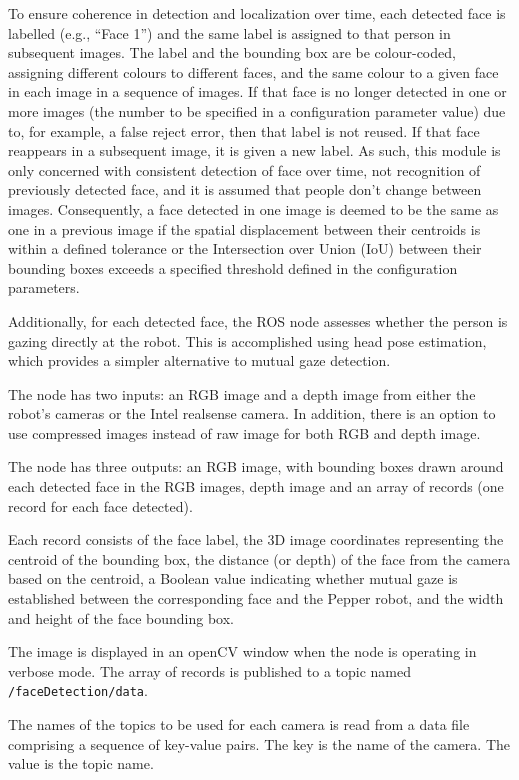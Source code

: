 \documentclass{CSSRforAfrica}
\begin{document}
To ensure coherence in detection and localization over time, each detected face is labelled (e.g., ``Face 1'') and the same label is assigned to that person in subsequent images.  The label and the bounding box are be colour-coded, assigning different colours to different faces, and the same colour to a given face in each image in a sequence of images.   If that face is no longer detected in one or more images  (the number to be specified in a configuration parameter value) due to, for example, a false reject error, then that label is not reused. If that face reappears in a subsequent image, it is given a new label. As such, this module is only concerned with consistent detection of face over time, not recognition of previously detected face, and it is assumed that people don't change between images.  Consequently, a face detected in one image is deemed to be the same as one in a previous image if the spatial displacement between their centroids is within a defined tolerance or the Intersection over Union (IoU) between their bounding boxes exceeds a specified threshold defined in the configuration parameters.

Additionally, for each detected face, the ROS node assesses whether the person is gazing directly at the robot. This is accomplished using head pose estimation, which provides a simpler alternative to mutual gaze detection.

The node has two inputs: an RGB image and a depth image from either the robot’s cameras or the Intel realsense camera. In addition, there is an option to use compressed images instead of raw image for both RGB and depth image.

The node has three outputs: an RGB image, with bounding boxes drawn around each detected face in the RGB images, depth image and an array of  records (one record for each face detected).  

Each record consists of the face label, the 3D image coordinates representing the centroid of the bounding box, the distance (or depth) of the face from the camera based on the centroid, a Boolean value indicating whether mutual gaze is established between the corresponding face and the Pepper robot, and the width and height of the face bounding box.

The image is displayed in an openCV window when the node is operating in verbose mode.  The array of records is  published to a  topic named {\small \verb+/faceDetection/data+}.
 
The names of the topics to be used for each camera is read from a data file comprising a sequence of key-value pairs. The key is the name of the camera. The value is the topic name.    
\end{document}
